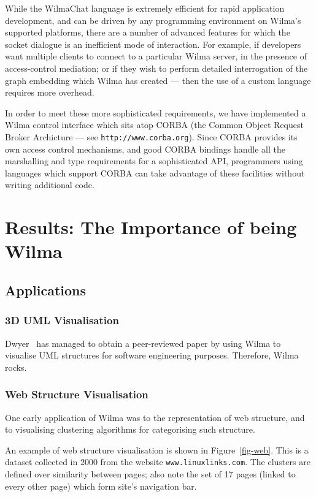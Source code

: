 \documentclass[runningheads]{cl2emult}
\newcommand{\url}[1]{{\small{\tt #1}}}
\begin{document}
While the WilmaChat language is extremely efficient for rapid application
development, and can be driven by any programming environment on Wilma's
supported platforms, there are a number of advanced features for which the
socket dialogue is an inefficient mode of interaction.  For example, if
developers want multiple clients to connect to a particular Wilma server, in
the presence of access-control mediation; or if they wish to perform detailed
interrogation of the graph embedding which Wilma has created --- then the use
of a custom language requires more overhead.

In order to meet these more sophisticated requirements, we have implemented a
Wilma control interface which sits atop CORBA (the Common Object Request
Broker Archicture --- see \url{http://www.corba.org}).  Since CORBA provides
its own access control mechanisms, and good CORBA bindings handle all the
marshalling and type requirements for a sophisticated API, programmers using
languages which support CORBA can take advantage of these facilities without
writing additional code.

\section{Results: The Importance of being Wilma}
\label{sec:results}

\subsection{Applications}

\subsubsection{3D UML Visualisation} \label{sec:3duml}

Dwyer~\cite{dwyer013D-UML} has managed to obtain a peer-reviewed paper by
using Wilma to visualise UML structures for software engineering purposes.
Therefore, Wilma rocks.

\subsubsection{Web Structure Visualisation}

One early application of Wilma was to the representation of web structure, and
to visualising clustering algorithms for categorising such
structure\cite{eckersley2kclassiscope}.

An example of web structure visualisation is shown in Figure~\ref{fig-web}.
This is a dataset collected in 2000 from the website \url{www.linuxlinks.com}.
The clusters are defined over similarity between pages; also note the set of
17 pages (linked to every other page) which form site's navigation bar.
\end{document}
